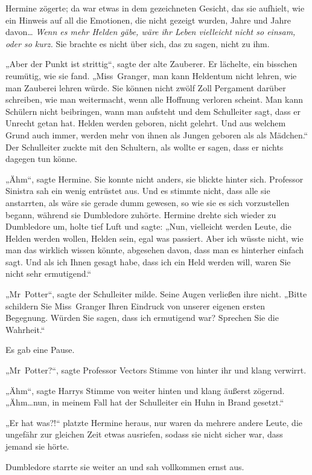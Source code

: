 {Hermine zögerte; da war etwas in dem gezeichneten Gesicht, das sie aufhielt, wie ein Hinweis auf all die Emotionen, die nicht gezeigt wurden, Jahre und Jahre davon… \emph{Wenn es mehr Helden gäbe, wäre ihr Leben vielleicht nicht so einsam, oder so kurz.} Sie brachte es nicht über sich, das zu sagen, nicht zu ihm.

„Aber der Punkt ist strittig“, sagte der alte Zauberer. Er lächelte, ein bisschen reumütig, wie sie fand. „Miss~Granger, man kann Heldentum nicht lehren, wie man Zauberei lehren würde. Sie können nicht zwölf Zoll Pergament darüber schreiben, wie man weitermacht, wenn alle Hoffnung verloren scheint. Man kann Schülern nicht beibringen, wann man aufsteht und dem Schulleiter sagt, dass er Unrecht getan hat. Helden werden geboren, nicht gelehrt. Und aus welchem Grund auch immer, werden mehr von ihnen als Jungen geboren als als Mädchen.“ Der Schulleiter zuckte mit den Schultern, als wollte er sagen, dass er nichts dagegen tun könne.

„Ähm“, sagte Hermine. Sie konnte nicht anders, sie blickte hinter sich. Professor Sinistra sah ein wenig entrüstet aus. Und es stimmte nicht, dass alle sie anstarrten, als wäre sie gerade dumm gewesen, so wie sie es sich vorzustellen begann, während sie Dumbledore zuhörte. Hermine drehte sich wieder zu Dumbledore um, holte tief Luft und sagte: „Nun, vielleicht werden Leute, die Helden werden wollen, Helden sein, egal was passiert. Aber ich wüsste nicht, wie man das wirklich wissen könnte, abgesehen davon, dass man es hinterher einfach sagt. Und als ich Ihnen gesagt habe, dass ich ein Held werden will, waren Sie nicht sehr ermutigend.“

„Mr~Potter“, sagte der Schulleiter milde. Seine Augen verließen ihre nicht. „Bitte schildern Sie Miss~Granger Ihren Eindruck von unserer eigenen ersten Begegnung. Würden Sie sagen, dass ich ermutigend war? Sprechen Sie die Wahrheit.“

Es gab eine Pause.

„Mr~Potter?“, sagte Professor Vectors Stimme von hinter ihr und klang verwirrt.

„Ähm“, sagte Harrys Stimme von weiter hinten und klang äußerst zögernd. „Ähm…nun, in meinem Fall hat der Schulleiter ein Huhn in Brand gesetzt.“

„Er hat was?!“ platzte Hermine heraus, nur waren da mehrere andere Leute, die ungefähr zur gleichen Zeit etwas ausriefen, sodass sie nicht sicher war, dass jemand sie hörte.

Dumbledore starrte sie weiter an und sah vollkommen ernst aus.

}
